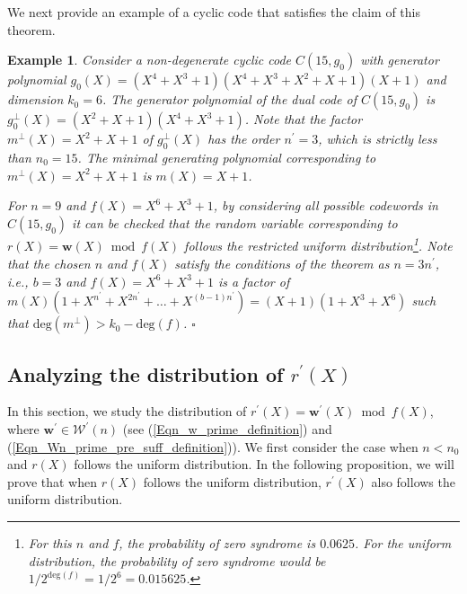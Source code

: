 \documentclass[10pt,journal]{IEEEtran}
\newtheorem{example}{Example}
\def \deg{{\mathrm{deg}}}
\begin{document}
We next provide an example of a cyclic code that satisfies the claim of this theorem.
% 
\begin{example}
\label{Example_thm_iff_main}
%  
Consider a non-degenerate cyclic code $C(15,g_0)$ with generator polynomial $g_0(X) = (X^4+X^3+1)(X^4+X^3+X^2+X+1)(X+1)$
and dimension $k_0 = 6$. 
The generator polynomial of the dual code of $C(15,g_0)$ is 
$g_0^{\perp}(X) = (X^2 + X + 1) (X^4 + X^3 + 1)$. Note that the factor $m^{\perp}(X) = X^2 + X + 1$
of $g_0^{\perp}(X)$ has the order $n^{\prime}=3$, which is strictly less than $n_0=15$. 
The minimal generating polynomial corresponding to $m^{\perp}(X) = X^2 + X + 1$ is $m(X) = X+1$.

For $n=9$ and $f(X) = X^6+X^3+1$, by considering all possible codewords in $C(15,g_0)$
it can be checked that the random variable corresponding to $r(X) = \mathbf{w}(X) \bmod f(X)$ follows 
the restricted uniform distribution\footnote{For this $n$ and $f$, the probability of zero syndrome is $0.0625$. 
For the uniform distribution,
the probability of zero syndrome would be $1/2^{\deg(f)} = 1/2^6 = 0.015625$.}.
% 
Note that the chosen $n$ and $f(X)$ satisfy the conditions of the theorem as
$n=3n^{\prime}$, i.e., $b=3$ and $f(X) = X^6+X^3+1$ is a factor 
of $m(X)(1+X^{n^{\prime}}+X^{2n^{\prime}}+\ldots+X^{(b-1)n^{\prime}}) = (X+1) (1+X^3+X^6)$
such that $\deg(m^{\perp}) > k_0-\deg(f)$.
% 
\hfill $\square$
% 
\end{example}
% 


\subsection{Analyzing the distribution of $r^{\prime}(X)$}
\label{SubSection_cyclic_strure_w_prefix_suffix}

In this section, we study the distribution of $r^{\prime}(X) = \mathbf{w}^{\prime}(X) \bmod f(X)$, 
where $\mathbf{w}^{\prime} \in \mathcal{W}^{\prime}(n)$ (see (\ref{Eqn_w_prime_definition}) and (\ref{Eqn_Wn_prime_pre_suff_definition})).
We first consider the case when $n < n_0$ and $r(X)$ follows the uniform distribution.
In the following proposition, we will prove that when $r(X)$ follows the uniform distribution, 
$r^{\prime}(X)$ also follows the uniform distribution.
\end{document}
